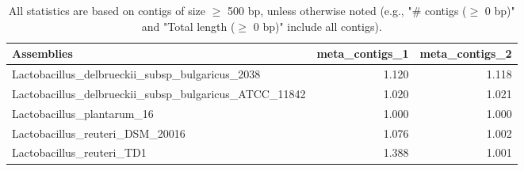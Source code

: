 \documentclass[12pt,a4paper]{article}
\begin{document}
\begin{table}[ht]
\begin{center}
\caption{All statistics are based on contigs of size $\geq$ 500 bp, unless otherwise noted (e.g., "\# contigs ($\geq$ 0 bp)" and "Total length ($\geq$ 0 bp)" include all contigs).}
\begin{tabular}{|l*{2}{|r}|}
\hline
Assemblies & meta\_contigs\_1 & meta\_contigs\_2 \\ \hline
Lactobacillus\_delbrueckii\_subsp\_bulgaricus\_2038 & 1.120 & 1.118 \\ \hline
Lactobacillus\_delbrueckii\_subsp\_bulgaricus\_ATCC\_11842 & 1.020 & 1.021 \\ \hline
Lactobacillus\_plantarum\_16 & 1.000 & 1.000 \\ \hline
Lactobacillus\_reuteri\_DSM\_20016 & 1.076 & 1.002 \\ \hline
Lactobacillus\_reuteri\_TD1 & 1.388 & 1.001 \\ \hline
\end{tabular}
\end{center}
\end{table}
\end{document}
